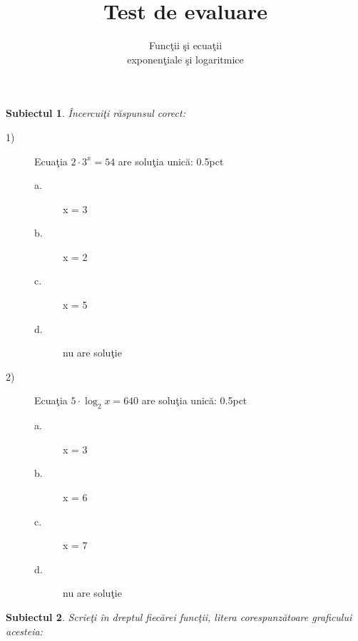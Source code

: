 \documentclass[a4paper, 12pt]{scrartcl}
\title{
    Test de evaluare
}
\subtitle{Func\c tii \c si ecua\c tii \\
exponen\c tiale \c si logaritmice}
\author{}
\date{}
\theoremstyle{plain}
\newtheorem{subiect}{Subiectul}
\begin{document}
\maketitle

\begin{subiect}
    \^ Incercui\c ti r\u aspunsul corect:
\end{subiect}


\begin{description}
    \item[1)] Ecua\c tia \(2 \cdot 3^x = 54 \) are solu\c tia unic\u a: \hfill 0.5pct
    {
        \begin{paracol}{3}
            \begin{description}
                \item[a.] x = 3 
                \item[b.] x = 2 
            \end{description}
            \switchcolumn
            \begin{description}
                \item[c.] x = 5
                \item[d.] nu are solu\c tie 
            \end{description}
            \switchcolumn
        \end{paracol}
    }
    \item[2)] Ecua\c tia \(5 \cdot \log_2{x} = 640 \) are solu\c tia unic\u a: \hfill 0.5pct
    {
        \begin{paracol}{3}
            \begin{description}
                \item[a.] x = 3 
                \item[b.] x = 6 
            \end{description}
            \switchcolumn
            \begin{description}
                \item[c.] x = 7
                \item[d.]nu are solu\c tie 
            \end{description}
            \switchcolumn
        \end{paracol}
    }
\end{description}

\begin{subiect}
    Scrie\c ti \^in dreptul fiec\u arei func\c tii, litera corespunz\u atoare graficului acesteia:
\end{subiect}
\end{document}
